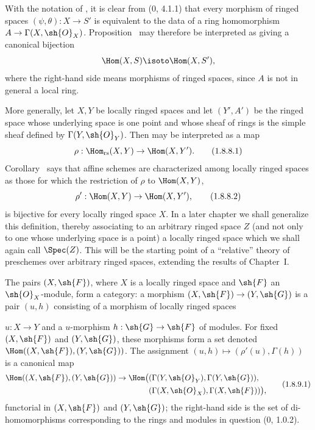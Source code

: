 \begin{env}[1.8.8]
\label{ega2:addendum:I.1.8.8}
With the notation of , it is clear from (0, 4.1.1) that
every morphism of ringed spaces $(\psi,\theta):X\to S'$ is equivalent
to the data of a ring homomorphism
$A\to\Gamma(X,\sh{O}_X)$.  Proposition~ may therefore
be interpreted as giving a canonical bijection
\[
  \Hom(X,S)\isoto\Hom(X,S'),
\]
where the right-hand side means morphisms of ringed spaces, since $A$
is not in general a local ring.

More generally, let $X,Y$ be locally ringed spaces and let $(Y',A')$
be the ringed space whose underlying space is one point and whose
sheaf of rings is the simple sheaf defined by
$\Gamma(Y,\sh{O}_Y)$.  Then  may be interpreted as a
map
\begin{equation}
\label{ega2:addendum:I.1.8.8.1}
  \rho:\Hom_{\mathrm{rs}}(X,Y)\to\Hom(X,Y').
\tag{1.8.8.1}
\end{equation}
Corollary~ says that affine schemes are characterized
among locally ringed spaces as those for which the restriction of
$\rho$ to $\Hom(X,Y)$,
\begin{equation}
\label{ega2:addendum:I.1.8.8.2}
  \rho':\Hom(X,Y)\to\Hom(X,Y'),
\tag{1.8.8.2}
\end{equation}
is bijective for every locally ringed space $X$.  In a later chapter
we shall generalize this definition, thereby associating to an
arbitrary ringed space $Z$ (and not only to one whose underlying
space is a point) a locally ringed space which we shall again call
$\Spec(Z)$.  This will be the starting point of a ``relative'' theory
of preschemes over arbitrary ringed spaces, extending the results of
Chapter~I.
\end{env}

\begin{env}[1.8.9]
\label{ega2:addendum:I.1.8.9}
The pairs $(X,\sh{F})$, where $X$ is a locally ringed space and
$\sh{F}$ an $\sh{O}_X$-module, form a category: a morphism
$(X,\sh{F})\to(Y,\sh{G})$ is a pair $(u,h)$ consisting of a morphism
of locally ringed spaces

$u:X\to Y$ and a $u$-morphism $h:\sh{G}\to\sh{F}$ of modules.  For
fixed $(X,\sh{F})$ and $(Y,\sh{G})$, these morphisms form a set denoted
$\Hom((X,\sh{F}),(Y,\sh{G}))$.  The assignment
$(u,h)\mapsto(\rho'(u),\Gamma(h))$ is a canonical map
\begin{equation}
\label{ega2:addendum:I.1.8.9.1}
\begin{split}
  \Hom((X,\sh{F}),(Y,\sh{G}))\to
  \Hom\bigl(
    &(\Gamma(Y,\sh{O}_Y),\Gamma(Y,\sh{G})),\\
    &(\Gamma(X,\sh{O}_X),\Gamma(X,\sh{F}))
  \bigr),
\end{split}
\tag{1.8.9.1}
\end{equation}
functorial in $(X,\sh{F})$ and $(Y,\sh{G})$; the right-hand side is
the set of di-homomorphisms corresponding to the rings and modules in
question (0, 1.0.2).
\end{env}


